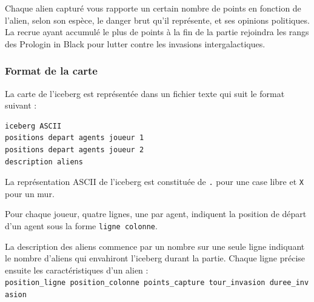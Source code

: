Chaque alien capturé vous rapporte un certain nombre de points en
fonction de l'alien, selon son espèce, le danger brut qu'il représente,
et ses opinions politiques. La recrue ayant accumulé le plus de points à
la fin de la partie rejoindra les rangs des Prologin in Black pour
lutter contre les invasions intergalactiques.

\subsubsection{Format de la carte}\label{format-de-la-carte}

La carte de l'iceberg est représentée dans un fichier texte qui suit le
format suivant :

\begin{verbatim}
iceberg ASCII
positions depart agents joueur 1
positions depart agents joueur 2
description aliens
\end{verbatim}

La représentation ASCII de l'iceberg est constituée de \texttt{.} pour
une case libre et \texttt{X} pour un mur.

Pour chaque joueur, quatre lignes, une par agent, indiquent la position
de départ d'un agent sous la forme \texttt{ligne\ colonne}.

La description des aliens commence par un nombre sur une seule ligne
indiquant le nombre d'aliens qui envahiront l'iceberg durant la partie.
Chaque ligne précise ensuite les caractéristiques d'un alien :
\texttt{position\_ligne\ position\_colonne\ points\_capture\ tour\_invasion\ duree\_invasion}
